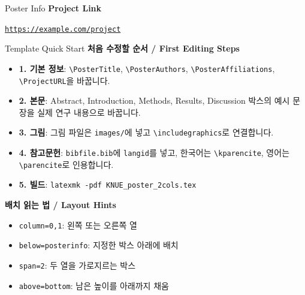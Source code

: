 \documentclass[a0paper,portrait]{KNUE_baposter}
\newcommand{\ProjectURL}{https://example.com/project}
\begin{document}
\begin{poster}
\begin{posterbox}[name=posterinfo,column=1,below=abstract]{Poster Info}
\vspace{0.6em}
\footnotesize
\textbf{Project Link}

\scriptsize
\href{\ProjectURL}{\nolinkurl{\ProjectURL}}
\end{posterbox}

%
\begin{posterbox}[name=boxlayoutguide,column=1,below=posterinfo]{Template Quick Start}
\tiny
\textbf{처음 수정할 순서 / First Editing Steps}

\begin{itemize}
\item \textbf{1. 기본 정보}: \texttt{\textbackslash PosterTitle}, \texttt{\textbackslash PosterAuthors}, \texttt{\textbackslash PosterAffiliations}, \texttt{\textbackslash ProjectURL}을 바꿉니다.
\item \textbf{2. 본문}: Abstract, Introduction, Methods, Results, Discussion 박스의 예시 문장을 실제 연구 내용으로 바꿉니다.
\item \textbf{3. 그림}: 그림 파일은 \texttt{images/}에 넣고 \texttt{\textbackslash includegraphics}로 연결합니다.
\item \textbf{4. 참고문헌}: \texttt{bibfile.bib}에 \texttt{langid}를 넣고, 한국어는 \texttt{\textbackslash kparencite}, 영어는 \texttt{\textbackslash parencite}로 인용합니다.
\item \textbf{5. 빌드}: \texttt{latexmk -pdf KNUE\_poster\_2cols.tex}
\end{itemize}

\vspace{0.25em}
\textbf{배치 읽는 법 / Layout Hints}

\begin{itemize}
\item \texttt{column=0,1}: 왼쪽 또는 오른쪽 열
\item \texttt{below=posterinfo}: 지정한 박스 아래에 배치
\item \texttt{span=2}: 두 열을 가로지르는 박스
\item \texttt{above=bottom}: 남은 높이를 아래까지 채움
\end{itemize}


\end{posterbox}
\end{poster}
\end{document}
